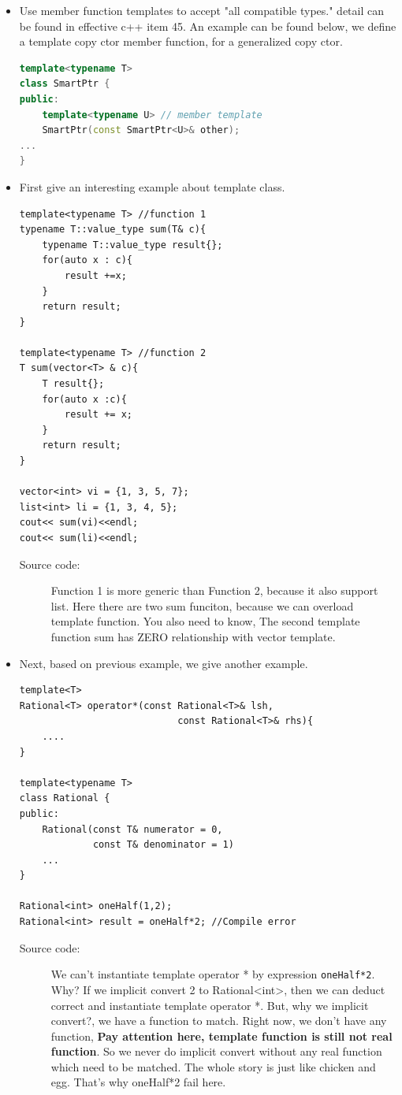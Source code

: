 \documentclass[a4paper,11pt,twoside]{book}
\begin{document}
\begin{itemize}
	\item Use member function templates to accept
	"all compatible types." detail can be found in effective c++ item 45. An example can be found below, we define a template copy ctor member function, for a generalized copy ctor.
	
\begin{lstlisting}[frame=single, language=c++]
template<typename T>
class SmartPtr {
public:
	template<typename U> // member template
	SmartPtr(const SmartPtr<U>& other); 
...
}
\end{lstlisting}
	
	\item First give an interesting example about template class. 
\begin{lstlisting}
template<typename T> //function 1
typename T::value_type sum(T& c){
	typename T::value_type result{};
	for(auto x : c){
		result +=x;
	}
	return result;
}

template<typename T> //function 2
T sum(vector<T> & c){
	T result{};
	for(auto x :c){
		result += x;
	}
	return result;
}

vector<int> vi = {1, 3, 5, 7};
list<int> li = {1, 3, 4, 5};
cout<< sum(vi)<<endl;
cout<< sum(li)<<endl;
\end{lstlisting}
\begin{description}
	\item[Source code:] Function 1 is more generic than Function 2, because it also support list. Here there are two sum funciton, because we can overload template function. You also need to know, The second template function sum has ZERO relationship with vector template.
\end{description}

	\item Next, based on previous example, we give another example.
\begin{lstlisting}
template<T>
Rational<T> operator*(const Rational<T>& lsh, 
							const Rational<T>& rhs){
	....
}

template<typename T>
class Rational {
public:
	Rational(const T& numerator = 0,
			 const T& denominator = 1)
	...
} 

Rational<int> oneHalf(1,2);
Rational<int> result = oneHalf*2; //Compile error
\end{lstlisting}
\begin{description}
	\item[Source code:] We can't instantiate template operator * by expression \texttt{oneHalf*2}. Why? If we implicit convert 2 to Rational<int>, then we can deduct correct and instantiate template operator *. But, why we implicit convert?, we have a function to match. Right now, we don't have any function, \textbf{Pay attention here, template function is still not real function}. So we never do implicit convert without any real function which need to be matched.  The whole story is just like chicken and egg. That's why oneHalf*2 fail here. 
\end{description}


\end{itemize}
\end{document}
